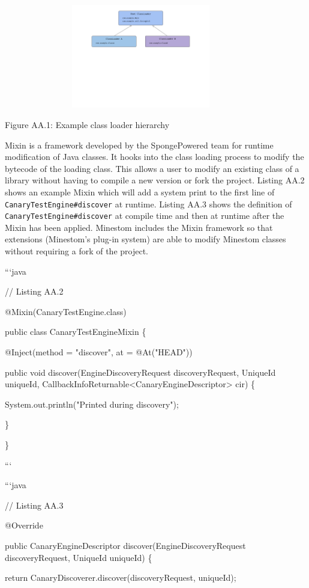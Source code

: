\documentclass{article}
\def\code#1{\texttt{#1}}
\begin{document}
\begin{onehalfspacing}
\includegraphics[width=4.71875in,height=1.7856in]{media/media/image1.png}

Figure AA.1: Example class loader hierarchy

Mixin is a framework developed by the SpongePowered team for runtime
modification of Java classes. It hooks into the class loading process to
modify the bytecode of the loading class. This allows a user to modify
an existing class of a library without having to compile a new version
or fork the project. Listing AA.2 shows an example Mixin which will add
a system print to the first line of \code{CanaryTestEngine\#discover} at
runtime. Listing AA.3 shows the definition of
\code{CanaryTestEngine\#discover} at compile time and then at runtime after
the Mixin has been applied. Minestom includes the Mixin framework so
that extensions (Minestom's plug-in system) are able to modify Minestom
classes without requiring a fork of the project.

```java

// Listing AA.2

@Mixin(CanaryTestEngine.class)

public class CanaryTestEngineMixin \{

@Inject(method = "discover", at = @At("HEAD"))

public void discover(EngineDiscoveryRequest discoveryRequest, UniqueId
uniqueId,
CallbackInfoReturnable\textless CanaryEngineDescriptor\textgreater{}
cir) \{

System.out.println("Printed during discovery");

\}

\}

```

```java

// Listing AA.3

@Override

public CanaryEngineDescriptor discover(EngineDiscoveryRequest
discoveryRequest, UniqueId uniqueId) \{

return CanaryDiscoverer.discover(discoveryRequest, uniqueId);


\end{onehalfspacing}
\end{document}

